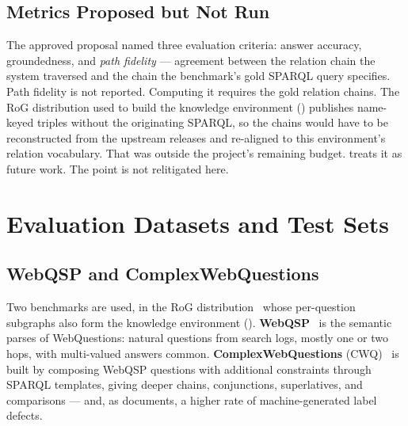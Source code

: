 \subsection{Metrics Proposed but Not Run}\label{sec:metrics-not-run}

The approved proposal named three evaluation criteria: answer accuracy,
groundedness, and \emph{path fidelity} --- agreement between the relation chain
the system traversed and the chain the benchmark's gold SPARQL query specifies.
Path fidelity is not reported. Computing it requires the gold relation chains.
The RoG distribution used to build the knowledge environment
() publishes name-keyed triples without the originating
SPARQL, so the chains would have to be reconstructed from the upstream releases
and re-aligned to this environment's relation vocabulary. That was outside the
project's remaining budget.  treats it as future
work. The point is not relitigated here.

\section{Evaluation Datasets and Test Sets}\label{sec:test-sets}

\subsection{WebQSP and ComplexWebQuestions}

Two benchmarks are used, in the RoG distribution~\cite{luo2024reasoning}
whose
per-question subgraphs also form the knowledge environment
().
\textbf{WebQSP}~\cite{yih2016value} is the semantic parses of WebQuestions:
natural questions from search logs, mostly one or two hops, with multi-valued
answers common. \textbf{ComplexWebQuestions} (CWQ)~\cite{talmor2018web} is built
by composing WebQSP questions with additional constraints through SPARQL
templates, giving deeper chains, conjunctions, superlatives, and comparisons ---
and, as  documents, a higher rate of machine-generated
label defects.

